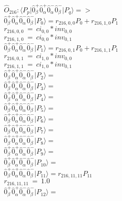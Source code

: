 \documentclass[14pt]{article}
\begin{document}
    $\hat{O}_{216}:  \langle{P_p}\vert \hat{0}_{\beta}^{+}\hat{0}_{\alpha}^{+}\hat{0}_{\alpha}^{-}\hat{0}_{\beta}^{-} \vert{P_q}\rangle => $ \\ 
    $ \hat{0}_{\beta}^{+}\hat{0}_{\alpha}^{+}\hat{0}_{\alpha}^{-}\hat{0}_{\beta}^{-} \vert{P_{0}}\rangle = {r}_{216,0,0}P_{0}+{r}_{216,1,0}P_{1} $ \\ 
    ${r}_{216,0,0}\ =\ {ci}_{0,0}*{inv}_{0,0} $ \\ 
    ${r}_{216,1,0}\ =\ {ci}_{0,0}*{inv}_{0,1} $ \\ 
    $ \hat{0}_{\beta}^{+}\hat{0}_{\alpha}^{+}\hat{0}_{\alpha}^{-}\hat{0}_{\beta}^{-} \vert{P_{1}}\rangle = {r}_{216,0,1}P_{0}+{r}_{216,1,1}P_{1} $ \\ 
    ${r}_{216,0,1}\ =\ {ci}_{1,0}*{inv}_{0,0} $ \\ 
    ${r}_{216,1,1}\ =\ {ci}_{1,0}*{inv}_{0,1} $ \\ 
    $ \hat{0}_{\beta}^{+}\hat{0}_{\alpha}^{+}\hat{0}_{\alpha}^{-}\hat{0}_{\beta}^{-} \vert{P_{2}}\rangle =  $ \\ 
    $ \hat{0}_{\beta}^{+}\hat{0}_{\alpha}^{+}\hat{0}_{\alpha}^{-}\hat{0}_{\beta}^{-} \vert{P_{3}}\rangle =  $ \\ 
    $ \hat{0}_{\beta}^{+}\hat{0}_{\alpha}^{+}\hat{0}_{\alpha}^{-}\hat{0}_{\beta}^{-} \vert{P_{4}}\rangle =  $ \\ 
    $ \hat{0}_{\beta}^{+}\hat{0}_{\alpha}^{+}\hat{0}_{\alpha}^{-}\hat{0}_{\beta}^{-} \vert{P_{5}}\rangle =  $ \\ 
    $ \hat{0}_{\beta}^{+}\hat{0}_{\alpha}^{+}\hat{0}_{\alpha}^{-}\hat{0}_{\beta}^{-} \vert{P_{6}}\rangle =  $ \\ 
    $ \hat{0}_{\beta}^{+}\hat{0}_{\alpha}^{+}\hat{0}_{\alpha}^{-}\hat{0}_{\beta}^{-} \vert{P_{7}}\rangle =  $ \\ 
    $ \hat{0}_{\beta}^{+}\hat{0}_{\alpha}^{+}\hat{0}_{\alpha}^{-}\hat{0}_{\beta}^{-} \vert{P_{8}}\rangle =  $ \\ 
    $ \hat{0}_{\beta}^{+}\hat{0}_{\alpha}^{+}\hat{0}_{\alpha}^{-}\hat{0}_{\beta}^{-} \vert{P_{9}}\rangle =  $ \\ 
    $ \hat{0}_{\beta}^{+}\hat{0}_{\alpha}^{+}\hat{0}_{\alpha}^{-}\hat{0}_{\beta}^{-} \vert{P_{10}}\rangle =  $ \\ 
    $ \hat{0}_{\beta}^{+}\hat{0}_{\alpha}^{+}\hat{0}_{\alpha}^{-}\hat{0}_{\beta}^{-} \vert{P_{11}}\rangle = {r}_{216,11,11}P_{11} $ \\ 
    ${r}_{216,11,11}\ =\ 1.0 $ \\ 
    $ \hat{0}_{\beta}^{+}\hat{0}_{\alpha}^{+}\hat{0}_{\alpha}^{-}\hat{0}_{\beta}^{-} \vert{P_{12}}\rangle =  $ \\ 
\end{document}
